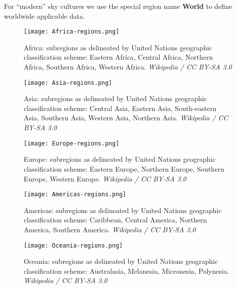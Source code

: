 \noindent For ``modern'' sky cultures we use the special region name \textbf{World} to define worldwide applicable data.

\begin{figure}[htbp]
	\centering\texttt{[image: Africa-regions.png]}
	\caption{Africa: subregions as delineated by United Nations geographic classification scheme:
           Eastern Africa,  Central Africa,  Northern Africa,
           Southern Africa,  Western Africa. \emph{Wikipedia / CC BY-SA 3.0}}
	\label{fig:skycultures:AfricaRegions}
\end{figure}

\begin{figure}[htbp]
	\centering\texttt{[image: Asia-regions.png]}
	\caption{Asia: subregions as delineated by United Nations geographic classification scheme:  Central Asia,
           Eastern Asia,  South-eastern Asia,  Southern Asia,
           Western Asia,  Northern Asia. \emph{Wikipedia / CC BY-SA 3.0}}
	\label{fig:skycultures:AsiaRegions}
\end{figure}

\begin{figure}[htbp]
	\centering\texttt{[image: Europe-regions.png]}
	\caption{Europe: subregions as delineated by United Nations geographic classification scheme:  Eastern Europe,
           Northern Europe,  Southern Europe,  Western Europe. \emph{Wikipedia / CC BY-SA 3.0}}
	\label{fig:skycultures:EuropeRegions}
\end{figure}

\begin{figure}[htbp]
	\centering\texttt{[image: Americas-regions.png]}
	\caption{Americas: subregions as delineated by United Nations geographic classification scheme:  Caribbean,
           Central America,  Northern America,  Southern America. \emph{Wikipedia / CC BY-SA 3.0}}
	\label{fig:skycultures:AmericasRegions}
\end{figure}

\begin{figure}[htbp]
	\centering\texttt{[image: Oceania-regions.png]}
	\caption{Oceania: subregions as delineated by United Nations geographic classification scheme:  Australasia, 
           Melanesia,  Micronesia,  Polynesia. \emph{Wikipedia / CC BY-SA 3.0}}
	\label{fig:skycultures:OceaniaRegions}
\end{figure}

